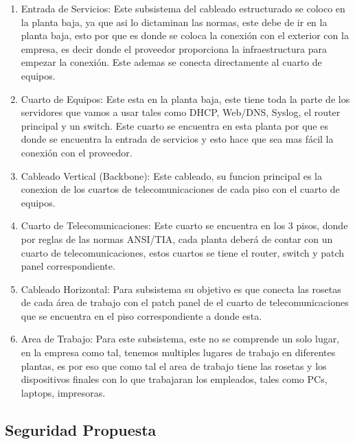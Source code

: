 \documentclass[letterpaper,11pt]{article}
\begin{document}
    \begin{enumerate}
        \item Entrada de Servicios: Este subsistema del cableado estructurado se coloco en la planta baja, ya que asi lo dictaminan las normas, este debe de ir en la planta baja, esto por que es donde se coloca la conexión con el exterior con la empresa, es decir donde el proveedor  proporciona la infraestructura para empezar la conexión. Este ademas se conecta directamente 
        al cuarto de equipos.
        \item Cuarto de Equipos: Este esta en la planta baja, este tiene toda la parte de los servidores que vamos a usar tales como 
        DHCP, Web/DNS, Syslog, el router principal y un switch. Este cuarto se encuentra en esta planta por que 
        es donde se encuentra la entrada de servicios y esto hace que sea mas fácil la conexión con el proveedor.
        \item Cableado Vertical (Backbone): Este cableado, su funcion principal es la conexion de los cuartos de telecomunicaciones de cada piso con el cuarto de equipos. 

        \item Cuarto de Telecomunicaciones: Este cuarto se encuentra en los 3 pisos, donde por reglas de las normas ANSI/TIA, cada planta deberá de
        contar con un cuarto de telecomunicaciones, estos cuartos se tiene el router, switch y patch panel correspondiente. 
        
        \item Cableado Horizontal: Para subsistema su objetivo es que conecta las rosetas de cada área de trabajo  con el patch panel de el cuarto de telecomunicaciones que se encuentra en el piso correspondiente a donde esta. 
        
        \item Area de Trabajo: Para este subsistema, este no se comprende un solo lugar, en la empresa como tal, tenemos multiples lugares de trabajo en diferentes plantas, es por eso que como tal el area de trabajo tiene las rosetas y los dispositivos finales con lo que trabajaran los empleados, tales 
        como PCs, laptops, impresoras.
    \end{enumerate}

    \subsection{Seguridad Propuesta}
\end{document}
